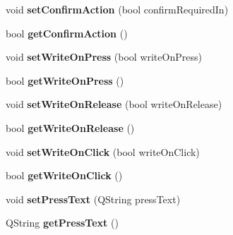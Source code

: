\begin{DoxyCompactItemize}
\item 
\hypertarget{classQEGenericButton_aec43f479686a791c5df8113cf849c7c7}{
void {\bfseries setConfirmAction} (bool confirmRequiredIn)}
\label{classQEGenericButton_aec43f479686a791c5df8113cf849c7c7}

\item 
\hypertarget{classQEGenericButton_ac1984be89b14830bee2228061a806510}{
bool {\bfseries getConfirmAction} ()}
\label{classQEGenericButton_ac1984be89b14830bee2228061a806510}

\item 
\hypertarget{classQEGenericButton_aa267a683f2f11a4e2470ed9a49235b4f}{
void {\bfseries setWriteOnPress} (bool writeOnPress)}
\label{classQEGenericButton_aa267a683f2f11a4e2470ed9a49235b4f}

\item 
\hypertarget{classQEGenericButton_afc06622288d5438905d7b1a43860c44b}{
bool {\bfseries getWriteOnPress} ()}
\label{classQEGenericButton_afc06622288d5438905d7b1a43860c44b}

\item 
\hypertarget{classQEGenericButton_a5af8a1705a759363397655991a0b6da9}{
void {\bfseries setWriteOnRelease} (bool writeOnRelease)}
\label{classQEGenericButton_a5af8a1705a759363397655991a0b6da9}

\item 
\hypertarget{classQEGenericButton_adaf829c6a326616cead45eee7bc50000}{
bool {\bfseries getWriteOnRelease} ()}
\label{classQEGenericButton_adaf829c6a326616cead45eee7bc50000}

\item 
\hypertarget{classQEGenericButton_a989de611f13b103372f465e3d58a18b7}{
void {\bfseries setWriteOnClick} (bool writeOnClick)}
\label{classQEGenericButton_a989de611f13b103372f465e3d58a18b7}

\item 
\hypertarget{classQEGenericButton_a592b8ccdb562a1cb9a8258d72ed2ce7c}{
bool {\bfseries getWriteOnClick} ()}
\label{classQEGenericButton_a592b8ccdb562a1cb9a8258d72ed2ce7c}

\item 
\hypertarget{classQEGenericButton_a1d6f3a5c804f4889ab45dd13d5780c50}{
void {\bfseries setPressText} (QString pressText)}
\label{classQEGenericButton_a1d6f3a5c804f4889ab45dd13d5780c50}

\item 
\hypertarget{classQEGenericButton_ac2131d96a8384bd16f25a7f4aebb9022}{
QString {\bfseries getPressText} ()}
\label{classQEGenericButton_ac2131d96a8384bd16f25a7f4aebb9022}


\end{DoxyCompactItemize}
